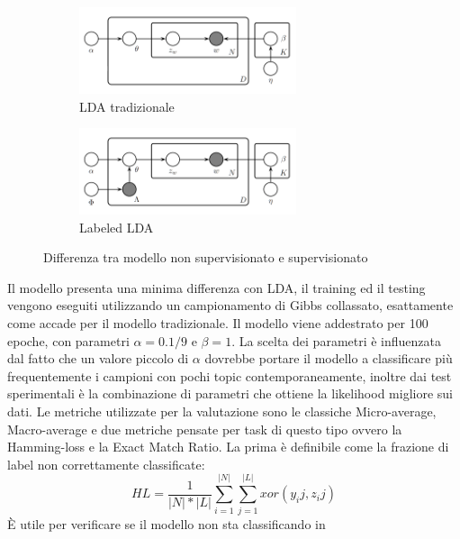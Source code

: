 \documentclass[technote]{IEEEtran}
\begin{document}
\begin{figure}[H]
\vspace{-5mm}
  \begin{subfigure}[b]{0.45\textwidth}
  \centering
    \includegraphics[width=0.7\textwidth]{images/lda}
    \caption{LDA tradizionale}
  \end{subfigure}
   \hfill
  \begin{subfigure}[b]{0.45\textwidth}
  \centering
    \includegraphics[width=0.7\textwidth]{images/llda}
    \caption{Labeled LDA}
  \end{subfigure}
  \caption{Differenza tra modello non supervisionato e supervisionato}
  \label{fig_llda}
\end{figure}
Il modello presenta una minima differenza con LDA, il training ed il testing vengono eseguiti utilizzando un campionamento di Gibbs collassato, esattamente come accade per il modello tradizionale. Il modello viene addestrato per 100 epoche, con parametri $ \alpha = 0.1 / 9 $ e $ \beta = 1 $. La scelta dei parametri è influenzata dal fatto che un valore piccolo di $ \alpha $ dovrebbe portare il modello a classificare più frequentemente i campioni con pochi topic contemporaneamente, inoltre dai test sperimentali è la combinazione di parametri che ottiene la likelihood migliore sui dati.
Le metriche utilizzate per la valutazione sono le classiche Micro-average, Macro-average e due metriche pensate per task di questo tipo ovvero la Hamming-loss \cite{6772729} e la Exact Match Ratio. La prima è definibile come la frazione di label non correttamente classificate:
\begin{equation}
HL=\frac{1}{|N|*|L|}\sum_{i=1}^{|N|}\sum_{j=1}^{|L|}xor(y_ij, z_ij)
\end{equation}
\`E utile per verificare se il modello non sta classificando in
\end{document}
